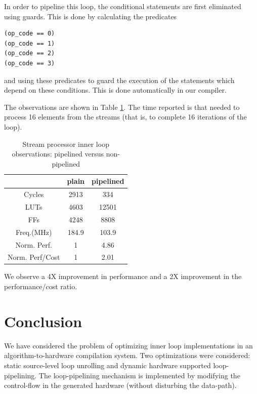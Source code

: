 \documentclass[conference]{IEEEtran}
\begin{document}
In order to pipeline this loop, the conditional
statements are first eliminated using guards.   This
is done by calculating the predicates 
\begin{verbatim}
(op_code == 0)
(op_code == 1)
(op_code == 2)
(op_code == 3)
\end{verbatim}
and using these predicates to guard the execution of
the statements which depend on these conditions.  This
is done automatically in our compiler.

The observations are shown in Table \ref{table:streamProcessor}.
The time reported is that needed to process 16 elements from
the streams (that is, to complete 16 iterations of the loop).
\begin{table}[htb]
  \centering
  \caption{Stream processor inner loop observations: pipelined versus non-pipelined}
  \label{table:streamProcessor}
  \renewcommand\arraystretch{1.2}
  \setlength{\tabcolsep}{1ex}
  \begin{tabular}{c|c|c}
  \hline
  & plain & pipelined \\
  \hline

Cycles   &    2913  &   334  \\
LUTs     &    4603  &  12501  \\
FFs      &    4248  &  8808  \\
Freq.(MHz)  & 184.9  &   103.9 \\
Norm. Perf. & 1      &  4.86 \\
Norm. Perf/Cost & 1  &  2.01  \\
\hline
  \end{tabular}
\end{table}

We observe a 4X improvement in performance and a 2X improvement
in the performance/cost ratio.

\section{Conclusion}

We have considered the problem of optimizing inner loop
implementations in an algorithm-to-hardware compilation system.
Two optimizations were considered: static source-level loop
unrolling and dynamic hardware supported loop-pipelining.
The loop-pipelining mechanism is implemented by modifying
the control-flow in the generated hardware (without disturbing
the data-path).
\end{document}
